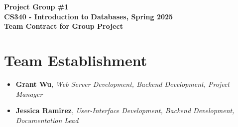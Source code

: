\documentclass{article}
\begin{document}
\begin{center}
\large\textcolor{primarycolor}{\textbf{Project Group \#1}}\\[0.3cm]
\large\textbf{CS340 - Introduction to Databases, Spring 2025}\\[0.5cm]
\huge\textbf{Team Contract for Group Project}\\[1.25cm]
\end{center}

\section{Team Establishment}

\begin{tcolorbox}[colback=secondarycolor, colframe=primarycolor, title=\textbf{Team Members and Roles:}]
\begin{itemize}
  \item \textbf{Grant Wu}, \textit{Web Server Development, Backend Development, Project Manager}
  \item \textbf{Jessica Ramirez}, \textit{User-Interface Development, Backend Development, Documentation Lead}
\end{itemize}
\end{tcolorbox}

\vspace{0.5cm}
\end{document}
